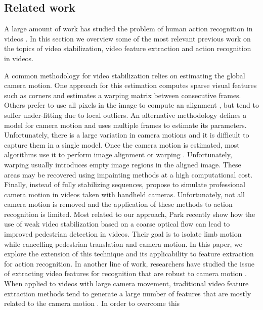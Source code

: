 \subsection{Related work}
A large amount of work has studied the problem of human action recognition in videos \cite{Aggarwal2011}. In
this section we overview some of the most relevant previous work on the topics of video stabilization, video
feature extraction and action recognition in videos.

A common methodology for video stabilization relies on estimating the global camera motion. One approach for
this estimation computes sparse visual features \cite{Brown2003,Capel1998, Zoghlami1997} such as corners
\cite{Censi1999} and estimates a warping matrix between consecutive frames. Others prefer to use all pixels
in the image to compute an alignment \cite{Lucas1981, Matsushita2006}, but tend to suffer under-fitting due
to local outliers. An alternative methodology defines a model for camera motion
\cite{Buehler2001,Hansen1994} and uses multiple frames to estimate its parameters. Unfortunately, there is a
large variation in camera motions and it is difficult to capture them in a single model. Once the camera
motion is estimated, most algorithms use it to perform image alignment or warping \cite{szeliski2006image}.
Unfortunately, warping usually introduces empty image regions in the aligned image. These areas may be
recovered using impainting methods \cite{Wexler2004} at a high computational cost. Finally, instead of fully
stabilizing sequences, \cite{Gleicher2008,GrundmannKwatra2011} propose to simulate professional camera
motion in videos taken with handheld cameras. Unfortunately, not all camera motion is removed and the
application of these methods to action recognition is limited. Most related to our approach, Park \etal
\cite{Park2013} recently show how the use of weak video stabilization based on a coarse optical flow can
lead to improved pedestrian detection in videos. Their goal is to isolate limb motion while cancelling
pedestrian translation and camera motion. In this paper, we explore the extension of this technique and its
applicability to feature extraction for action recognition.
In another line of work, researchers have studied the issue of extracting video features for recognition
that are robust to camera motion \cite{Jain2013,Gross2012,Wu2011a}. When applied to videos with large camera
movement, traditional video feature extraction methods tend to generate a large number of features that are
mostly related to the camera motion \cite{Dollar2005, Laptev2005, WangCVPR2011}. In order to overcome this
